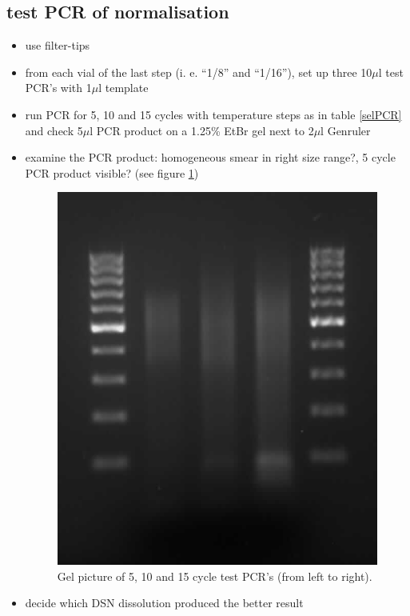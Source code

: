 \subsection
{test PCR of normalisation}
\begin{itemize}
\item {\color{red}use filter-tips}
\item from each vial of the last step (i. e. ``1/8'' and ``1/16''), set up three 10$\mu$l test PCR's with 1$\mu$l template
\item run PCR for 5, 10 and 15 cycles with temperature steps as in table \ref{selPCR} and check 5$\mu$l PCR product on a 1.25\% EtBr gel next to 2$\mu$l Genruler
\item examine the PCR product: homogeneous smear in right size range?, 5 cycle PCR product visible? (see figure \ref{NormTestPCR})

\begin{figure}[!htb]
\begin{center}
\includegraphics[scale=0.4]{Normalisation_test_lib_PCR_28072011}
\caption{Gel picture of 5, 10 and 15 cycle test PCR's (from left to right).}
\label{NormTestPCR}
\end{center}
\end{figure}

\item decide which DSN dissolution produced the better result
\end{itemize}

